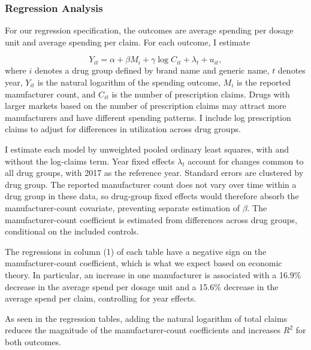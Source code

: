 \subsubsection{Regression Analysis}

For our regression specification, the outcomes are average spending per dosage unit and average spending per claim. For each outcome, I estimate

\[
Y_{it}=\alpha+\beta M_i+\gamma\log C_{it}+\lambda_t+u_{it},
\]
where $i$ denotes a drug group defined by brand name and generic name, $t$ denotes year, $Y_{it}$ is the natural logarithm of the spending outcome, $M_i$ is the reported manufacturer count, and $C_{it}$ is the number of prescription claims. Drugs with larger markets based on the number of prescription claims may attract more manufacturers and have different spending patterns. I include log prescription claims to adjust for differences in utilization across drug groups.

I estimate each model by unweighted pooled ordinary least squares, with and without the log-claims term. Year fixed effects $\lambda_t$ account for changes common to all drug groups, with 2017 as the reference year. Standard errors are clustered by drug group. The reported manufacturer count does not vary over time within a drug group in these data, so drug-group fixed effects would therefore absorb the manufacturer-count covariate, preventing separate estimation of $\beta$. The manufacturer-count coefficient is estimated from differences across drug groups, conditional on the included controls.






The regressions in column (1) of each table have a negative sign on the manufacturer-count coefficient, which is what we expect based on economic theory. In particular, an increase in one manufacturer is associated with a 16.9\% decrease in the average spend per dosage unit and a 15.6\% decrease in the average spend per claim, controlling for year effects.

As seen in the regression tables, adding the natural logarithm of total claims reduces the magnitude of the manufacturer-count coefficients and increases $R^2$ for both outcomes.

